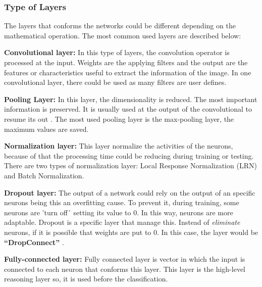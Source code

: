 \subsubsection{Type of Layers}
The layers that conforms the networks could be different depending on the mathematical operation. The most common used layers are described below:
\begin{description}[noitemsep,topsep=8pt,parsep=0pt,partopsep=20pt]
	\item \textbf{Convolutional layer:} In this type of layers, the convolution operator is processed at the input. Weights are the applying filters and the output are the features or characteristics useful to extract the information of the image. In one convolutional layer, there could be used as many filters are user defines.
	\item \textbf{Pooling Layer:} In this layer, the dimensionality is reduced. The most important information is preserved. It is usually used at the output of the convolutional to resume its out \cite{Doorn}. The most used pooling layer is the max-pooling layer, the maximum values are saved.
	\item \textbf{Normalization layer:} This layer normalize the activities of the neurons, because of that the processing time could be reducing during training or testing. There are two types of normalization layer: Local Response Normalization (LRN) and Batch Normalization.
	\item \textbf{Dropout layer:} The output of a network could rely on the output of an specific neurons being this an overfitting cause. To prevent it, during training, some neurons are 'turn off´ setting its value to 0. In this way, neurons are more adaptable. Dropout is a specific layer that manage this. Instead of \textit{eliminate} neurons, if it is possible that weights are put to 0. In this case, the layer would be \textbf{``DropConnect''} \cite{Doorn}.
	\item  \textbf{Fully-connected layer:} Fully connected layer is vector in which the input is connected to each neuron that conforms this layer. This layer is the high-level reasoning layer so, it is used before the classification.
\end{description}

